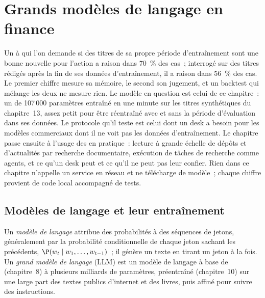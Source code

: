 \chapter{Grands modèles de langage en finance}\label{ch:ml:large-language-models-in-finance}

Un  à qui l'on demande si des titres de sa propre période d'entraînement sont une bonne nouvelle pour l'action a raison dans 70~\% des
cas~; interrogé sur des titres rédigés après la fin de ses données d'entraînement, il a raison dans 56~\% des cas. Le premier chiffre mesure
sa mémoire, le second son jugement, et un backtest qui mélange les deux ne mesure rien. Le modèle en question est celui de ce
chapitre~: un  de 107\,000 paramètres entraîné en une minute sur les titres synthétiques du chapitre~13, assez petit pour
être réentraîné avec et sans la période d'évaluation dans ses données. Le protocole qu'il teste est celui dont un desk a besoin pour
les modèles commerciaux dont il ne voit pas les données d'entraînement. Le chapitre passe ensuite à l'usage des  en
pratique~: lecture à grande échelle de dépôts et d'actualités par recherche documentaire, exécution de tâches de recherche comme agents, et ce qu'un desk peut
et ce qu'il ne peut pas leur confier. Rien dans ce chapitre n'appelle un service en réseau et ne télécharge de modèle~; chaque chiffre provient de code local
accompagné de tests.

\section{Modèles de langage et leur entraînement}

\begin{definition}\label{def:ml:large-language-models-in-finance:lm}
Un \emph{modèle de langage} attribue des probabilités à des séquences de jetons, généralement par la probabilité conditionnelle
de chaque jeton sachant les précédents, $\P(w_t\mid w_1,\dots,w_{t-1})$~; il génère un texte en tirant un
jeton à la fois. Un \emph{grand modèle de langage} (LLM) est un modèle de langage à base de  (chapitre~8)
à plusieurs milliards de paramètres, préentraîné (chapitre~10) sur une large part des textes publics d'internet et des livres, puis
affiné pour suivre des instructions.
\end{definition}

